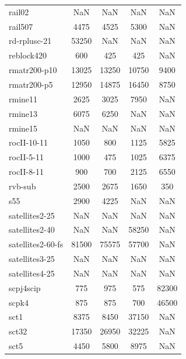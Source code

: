 \begin{longtable}{lcccc}
rail02                      &      NaN &      NaN &      NaN &   NaN \\
rail507                     &     4475 &     4525 &     5300 &   NaN \\
rd-rplusc-21                &    53250 &      NaN &      NaN &   NaN \\
reblock420                  &      600 &      425 &      425 &   NaN \\
rmatr200-p10                &    13025 &    13250 &    10750 &  9400 \\
rmatr200-p5                 &    12950 &    14875 &    16450 &  8750 \\
rmine11                     &     2625 &     3025 &     7950 &   NaN \\
rmine13                     &     6075 &     6250 &      NaN &   NaN \\
rmine15                     &      NaN &      NaN &      NaN &   NaN \\
rocII-10-11                 &     1050 &      800 &     1125 &  5825 \\
rocII-5-11                  &     1000 &      475 &     1025 &  6375 \\
rocII-8-11                  &      900 &      700 &     2125 &  6550 \\
rvb-sub                     &     2500 &     2675 &     1650 &   350 \\
s55                         &     2900 &     4225 &      NaN &   NaN \\
satellites2-25              &      NaN &      NaN &      NaN &   NaN \\
satellites2-40              &      NaN &      NaN &    58250 &   NaN \\
satellites2-60-fs           &    81500 &    75575 &    57700 &   NaN \\
satellites3-25              &      NaN &      NaN &      NaN &   NaN \\
satellites4-25              &      NaN &      NaN &      NaN &   NaN \\
scpj4scip                   &      775 &      975 &      575 & 82300 \\
scpk4                       &      875 &      875 &      700 & 46500 \\
sct1                        &     8375 &     8450 &    37150 &   NaN \\
sct32                       &    17350 &    26950 &    32225 &   NaN \\
sct5                        &     4450 &     5800 &     8975 &   NaN \\

\end{longtable}
